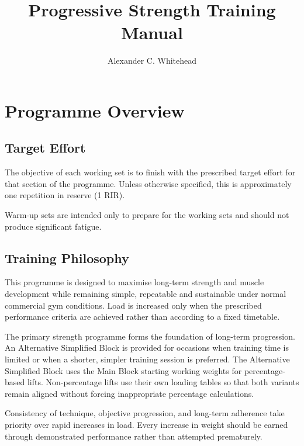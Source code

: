 \documentclass[11pt,a4paper]{article}
\title{Progressive Strength Training Manual}
\author{Alexander C. Whitehead}
\date{}
\begin{document}
\maketitle

\vspace{2cm}

\tableofcontents

\newpage

\section{Programme Overview}

\subsection{Target Effort}

The objective of each working set is to finish with the prescribed target effort for that section of the programme. Unless otherwise specified, this is approximately one repetition in reserve (1 RIR).

Warm-up sets are intended only to prepare for the working sets and should not produce significant fatigue.

\subsection{Training Philosophy}

This programme is designed to maximise long-term strength and muscle development while remaining simple, repeatable and sustainable under normal commercial gym conditions. Load is increased only when the prescribed performance criteria are achieved rather than according to a fixed timetable.

The primary strength programme forms the foundation of long-term progression. An Alternative Simplified Block is provided for occasions when training time is limited or when a shorter, simpler training session is preferred. The Alternative Simplified Block uses the Main Block starting working weights for percentage-based lifts. Non-percentage lifts use their own loading tables so that both variants remain aligned without forcing inappropriate percentage calculations.

Consistency of technique, objective progression, and long-term adherence take priority over rapid increases in load. Every increase in weight should be earned through demonstrated performance rather than attempted prematurely.
\end{document}
